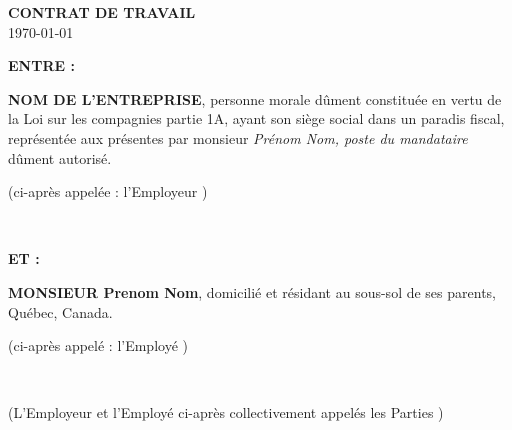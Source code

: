 \documentclass{article}
\newcommand{\tofill}[1]{\emph{#1}}
\begin{document}
	
	
%    

    \onehalfspacing
    
    {\centering \Large {\bfseries \uppercase{Contrat de Travail}} \\ \today \par} \vspace{2\baselineskip}
    
    \begin{minipage}[t]{0.45\textwidth}
    	\bfseries\uppercase{Entre :}
    \end{minipage}%
    \hfill%
    \begin{minipage}[t]{0.45\textwidth}
    	{\bfseries\uppercase{Nom de l'entreprise}}, personne morale dûment constituée en vertu de la Loi sur les compagnies partie 1A, ayant son siège social dans un paradis fiscal, représentée aux présentes par monsieur \tofill{Prénom Nom, poste du mandataire} dûment autorisé. \\ %

    	{\raggedleft (ci-après appelée : \og l'Employeur \fg{}) \par}    	
    \end{minipage} \\ \vspace{\baselineskip}
    
    \begin{minipage}[t]{0.45\textwidth}
    	\bfseries\uppercase{Et :}
    \end{minipage}%
    \hfill%
    \begin{minipage}[t]{0.45\textwidth}
    	{\bfseries\uppercase{Monsieur} Prenom Nom}, domicilié et résidant au sous-sol de ses parents, Québec, Canada. \\ %
    	
    	{\raggedleft (ci-après appelé : \og l'Employé \fg{}) \par}
    \end{minipage} \\ \vspace{\baselineskip}
    
    \begin{minipage}[t]{0.45\textwidth}
    \end{minipage}%
    \hfill%
    \begin{minipage}[t]{0.45\textwidth}
    	(L'Employeur et l'Employé ci-après collectivement appelés \og les Parties \fg{})
    \end{minipage} \\ \vspace{\baselineskip}
    
\end{document}
